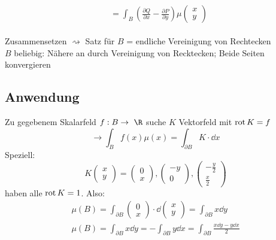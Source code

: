 \begin{satz*}[note = Satz von Green , index = Satz von Green , indexformat = {3!12~ 1!~23}]
\begin{bew}[note = für $B$ Rechteck]
\begin{gather*}
\begin{split}
				&= \int_B \left( \frac{\partial Q}{\partial x} - \frac{\partial P}{\partial y} \right) \mu\begin{pmatrix} x \\ y \end{pmatrix}
			\end{split}
		\end{gather*}
	\end{bew}
	Zusammensetzen $\rightsquigarrow$ Satz für $B$ = endliche Vereinigung von Rechtecken \\
	$B$ beliebig: Nähere an durch Vereinigung von Recktecken; Beide Seiten konvergieren
\end{satz*}

\subsection{Anwendung}
Zu gegebenem Skalarfeld $f: B \rightarrow \R$ suche $K$ Vektorfeld mit $\operatorname{rot} K = f$
\[ \rightarrow \int_B f(x) \mu(x) = \int_{\partial B} K \cdot \dd x \]
Speziell:
\[ K\begin{pmatrix} x \\ y \end{pmatrix} = \begin{pmatrix} 0 \\ x \end{pmatrix} , \begin{pmatrix} -y \\ 0 \end{pmatrix} , \begin{pmatrix} -\frac{y}{2} \\ \frac{x}{2} \end{pmatrix} \]
haben alle $\operatorname{rot} K = 1$. Also:
\begin{gather*}
	\mu(B) = \int_{\partial B} \begin{pmatrix} 0 \\ x \end{pmatrix} \cdot \dd\begin{pmatrix} x \\ y \end{pmatrix} = \int_{\partial B} x \dd y \\
	\mu(B) = \int_{\partial B} x \dd y = -\int_{\partial B} y \dd x = \int_{\partial B} \frac{x \dd y - y \dd x}{2}
\end{gather*}
